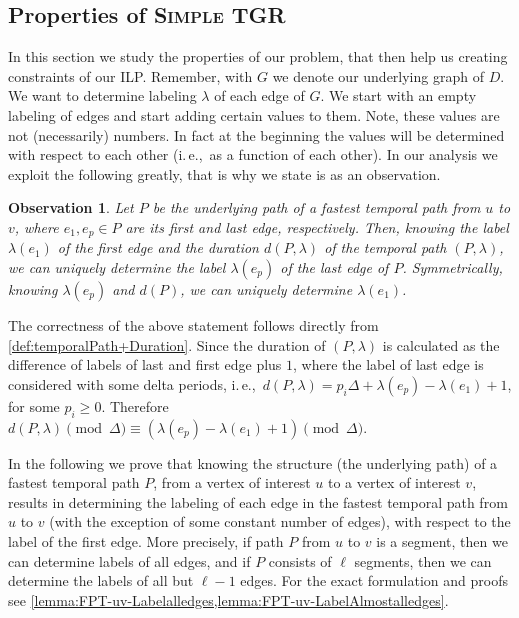 \documentclass[11pt,a4paper]{article}
\newtheorem{observation}{Observation}
\theoremstyle{remark}
\theoremstyle{definition}
\newcommand{\ie}{i.\,e.,\ }
\newcommand{\deltaExact}{\textsc{Simple TGR}}
\begin{document}
\subsection{Properties of 
\texorpdfstring{\deltaExact } {Simple Delta-TGR}
}

In this section we study the properties of our problem, that then help us creating constraints of our ILP.
Remember, with $G$ we denote our underlying graph of $D$. We want to determine labeling $\lambda$ of each edge of $G$.
We start with an empty labeling of edges and start adding certain values to them.
Note, these values are not (necessarily) numbers. 
In fact at the beginning the values will be determined with respect to each other (\ie as a function of each other).
In our analysis we exploit the following greatly, that is why we state is as an observation.

\begin{observation}\label{obs:FirstLabelAndDuration}
    Let $P$ be the underlying path of a fastest temporal path from $u$ to $v$, where $e_1, e_p \in P$ are its first and last edge, respectively.
    Then, knowing the label $\lambda (e_1)$ of the first edge and the duration $d(P,\lambda)$ of the temporal path $(P,\lambda)$, we can uniquely determine the label $\lambda (e_p)$ of the last edge of $P$.
    Symmetrically, knowing $\lambda(e_p)$ and $d(P)$, we can uniquely determine $\lambda(e_1)$.
\end{observation}
The correctness of the above statement follows directly from \cref{def:temporalPath+Duration}. Since the duration of $(P,\lambda)$ is calculated as the difference of labels of last and first edge plus $1$,
where the label of last edge is considered with some delta periods,
\ie $d(P,\lambda) = p_i \Delta + \lambda(e_p) - \lambda (e_1) + 1$, for some $p_i \geq 0$.
Therefore $d(P,\lambda) \pmod \Delta \equiv  (\lambda(e_p) - \lambda (e_1) + 1) \pmod \Delta$.

In the following we prove that knowing the structure (the underlying path) of a fastest temporal path $P$, from a vertex of interest $u$ to a vertex of interest $v$,
results in determining the labeling of each edge in the fastest temporal path from $u$ to $v$ 
(with the exception of some constant number of edges), with respect to the label of the first edge.
More precisely, if path $P$ from $u$ to $v$ is a segment, then we can determine labels of all edges,
and if $P$ consists of $\ell$ segments, then we can determine the labels of all but $\ell -1$ edges.
For the exact formulation and proofs see \cref{lemma:FPT-uv-Labelalledges,lemma:FPT-uv-LabelAlmostalledges}.
\end{document}
